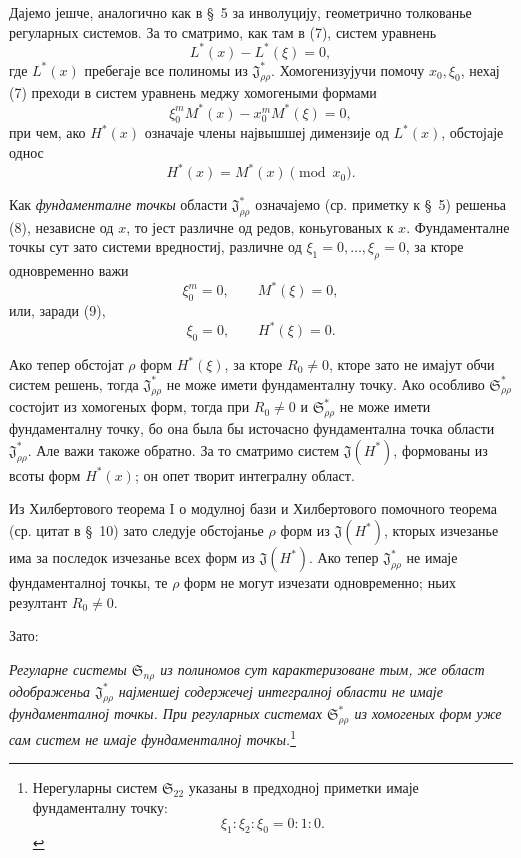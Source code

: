 ﻿\documentclass[11pt]{article}
\providecommand{\Ssys}{\mathfrak{S}}
\providecommand{\Jdom}{\mathfrak{J}}
\begin{document}
Дајемо јешче, аналогично как в \S\ 5 за инволуцију, геометрично толкованье регуларных системов. За то сматримо, как там в (7), систем уравнень
\begin{equation}
  L^*(x)-L^*(\xi)=0,
\tag{7}
\end{equation}
где $L^*(x)$ пребегаје все полиномы из $\Jdom^*_{\rho\rho}$. Хомогенизујучи помочу $x_0,\xi_0$, нехај (7) преходи в систем уравнень меджу хомогеными формами
\begin{equation}
  \xi_0^{m}M^*(x)-x_0^{m}M^*(\xi)=0,
\tag{8}
\end{equation}
при чем, ако $H^*(x)$ означаје члены највышшеј димензије од $L^*(x)$, обстојаје однос
\begin{equation}
  H^*(x)=M^*(x)\pmod{x_0}.
\tag{9}
\end{equation}

Как {\itshape фундаменталне точкы} области $\Jdom^*_{\rho\rho}$ означајемо (ср. приметку к \S\ 5) решеньа (8), независне од $x$, то јест различне од редов, коньугованых к $x$. Фундаменталне точкы сут зато системи вредностиј, различне од $\xi_1=0,\ldots,\xi_\rho=0$, за кторе одновременно важи
\[
  \xi_0^m=0,\qquad M^*(\xi)=0,
\]
или, заради (9),
\[
  \xi_0=0,
  \qquad H^*(\xi)=0.
\]

Ако тепер обстојат $\rho$ форм $H^*(\xi)$, за кторе $R_0\ne0$, кторе зато не имајут обчи систем решень, тогда $\Jdom^*_{\rho\rho}$ не може имети фундаменталну точку. Ако особливо $\Ssys^*_{\rho\rho}$ состојит из хомогеных форм, тогда при $R_0\ne0$ и $\Ssys^*_{\rho\rho}$ не може имети фундаменталну точку, бо она была бы источасно фундаментална точка области $\Jdom^*_{\rho\rho}$. Але важи такоже обратно. За то сматримо систем $\Jdom(H^*)$, формованы из всоты форм $H^*(x)$; он опет творит интегралну област.

Из Хилбертового теорема I о модулној бази и Хилбертового помочного теорема (ср. цитат в \S\ 10) зато следује обстојанье $\rho$ форм из $\Jdom(H^*)$, кторых изчезанье има за последок изчезанье всех форм из $\Jdom(H^*)$. Ако тепер $\Jdom^*_{\rho\rho}$ не имаје фундаменталној точкы, те $\rho$ форм не могут изчезати одновременно; ньих резултант $R_0\ne0$.

Зато:

{\itshape Регуларне системы $\Ssys_{n\rho}$ из полиномов сут карактеризоване тым, же област одображеньа $\Jdom^*_{\rho\rho}$ најменшеј содержечеј интегралној области не имаје фундаменталној точкы. При регуларных системах $\Ssys^*_{\rho\rho}$ из хомогеных форм уже сам систем не имаје фундаменталној точкы.}\footnote{Нерегуларны систем $\Ssys_{22}$ указаны в предходној приметки имаје фундаменталну точку:
\[
  \xi_1:\xi_2:\xi_0=0:1:0.
\]}
\end{document}
